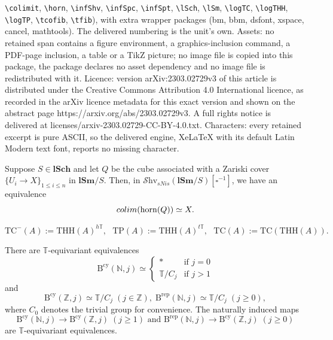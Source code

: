 \documentclass[10pt,a4paper]{amsart}
\newcommand{\Bcy}{\operatorname{B^{cy}}}
\newcommand{\Brep}{\operatorname{B^{rep}}}
\newcommand{\N}{\mathbb{N}}
\newcommand{\TC}{\mathrm{TC}}
\newcommand{\THH}{\mathrm{THH}}
\newcommand{\TP}{\mathrm{TP}}
\newcommand{\Z}{\mathbb{Z}}
\newcommand{\boxx}{\square}
\newcommand{\colimit}{\mathop{\rm colim}}
\newcommand{\horn}{\mathrm{horn}}
\newcommand{\infShv}{\mathcal{S}\mathrm{hv}}
\newcommand{\lSch}{\mathbf{lSch}}
\newcommand{\lSm}{\mathbf{lSm}}
\begin{document}
\texttt{\textbackslash colimit}, \texttt{\textbackslash horn}, \texttt{\textbackslash infShv}, \texttt{\textbackslash infSpc}, \texttt{\textbackslash infSpt}, \texttt{\textbackslash lSch}, \texttt{\textbackslash lSm}, \texttt{\textbackslash logTC}, \texttt{\textbackslash logTHH}, \texttt{\textbackslash logTP}, \texttt{\textbackslash tcofib}, \texttt{\textbackslash tfib}), with extra wrapper packages (bm, bbm, dsfont, xspace, cancel, mathtools). The delivered numbering is the unit's own. Assets: no retained span contains a figure environment, a graphics-inclusion command, a PDF-page inclusion, a table or a TikZ picture; no image file is copied into this package, the package declares no asset dependency and no image file is redistributed with it. Licence: version arXiv:2303.02729v3 of this article is distributed under the Creative Commons Attribution 4.0 International licence, as recorded in the arXiv licence metadata for this exact version and shown on the abstract page https://arxiv.org/abs/2303.02729v3. A full rights notice is delivered at licenses/arxiv-2303.02729-CC-BY-4.0.txt. Characters: every retained excerpt is pure ASCII, so the delivered engine, XeLaTeX with its default Latin Modern text font, reports no missing character.
\begin{prop}
\label{logHprop.3}
Suppose $S\in \lSch$ and let $Q$ be the cube associated with a Zariski cover 
$\{U_i\to X\}_{1\leq i\leq n}$ in $\lSm/S$.
Then, in $\infShv_{sNis}(\lSm/S)[\boxx^{-1}]$, we have an equivalence
\[
\colimit(\horn(Q))
\simeq
X.
\]
\end{prop}

\begin{equation}
\label{Hoch.37.1}
\TC^{-}(A)
:=
\THH(A)^{h\mathbb{T}},
\text{ }
\TP(A)
:=
\THH(A)^{t\mathbb{T}},
\text{ }
\TC(A)
:=
\TC(\THH(A)).
\end{equation}

\begin{prop}
\label{Hoch.9}
There are $\mathbb{T}$-equivariant equivalences
\[
\Bcy (\N,j)
\simeq
\left\{
\begin{array}{ll}
* & \text{if }j=0
\\
\mathbb{T}/C_j & \text{if }j>1
\end{array}
\right.
\]
and
\[
\Bcy (\Z,j)
\simeq
\mathbb{T}/C_j
\;
(j\in \Z),
\;
\Brep(\N,j)
\simeq
\mathbb{T}/C_j
\;
(j\geq 0),
\]
where $C_0$ denotes the trivial group for convenience.
The naturally induced maps
\[
\Bcy (\N,j)
\to
\Bcy(\Z,j)
\;
(j\geq 1)
\text{ and }
\Brep (\N,j)
\to
\Bcy(\Z,j)
\;
(j\geq 0)
\]
are $\mathbb{T}$-equivariant equivalences.
\end{prop}
\end{document}
